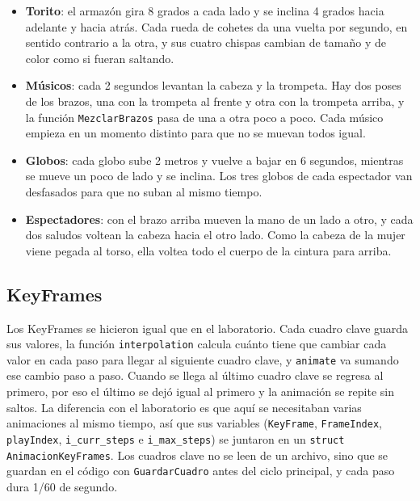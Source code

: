 \documentclass[11pt,a4paper]{article}
\begin{document}
\begin{itemize}
  \item \textbf{Torito}: el armazón gira 8 grados a cada lado y se inclina 4 grados hacia adelante y hacia atrás. Cada rueda de cohetes da una vuelta por segundo, en sentido contrario a la otra, y sus cuatro chispas cambian de tamaño y de color como si fueran saltando.
  \item \textbf{Músicos}: cada 2 segundos levantan la cabeza y la trompeta. Hay dos poses de los brazos, una con la trompeta al frente y otra con la trompeta arriba, y la función \texttt{MezclarBrazos} pasa de una a otra poco a poco. Cada músico empieza en un momento distinto para que no se muevan todos igual.
  \item \textbf{Globos}: cada globo sube 2 metros y vuelve a bajar en 6 segundos, mientras se mueve un poco de lado y se inclina. Los tres globos de cada espectador van desfasados para que no suban al mismo tiempo.
  \item \textbf{Espectadores}: con el brazo arriba mueven la mano de un lado a otro, y cada dos saludos voltean la cabeza hacia el otro lado. Como la cabeza de la mujer viene pegada al torso, ella voltea todo el cuerpo de la cintura para arriba.
\end{itemize}



\subsection{KeyFrames}

Los KeyFrames se hicieron igual que en el laboratorio. Cada cuadro clave guarda sus valores, la función \texttt{interpolation} calcula cuánto tiene que cambiar cada valor en cada paso para llegar al siguiente cuadro clave, y \texttt{animate} va sumando ese cambio paso a paso. Cuando se llega al último cuadro clave se regresa al primero, por eso el último se dejó igual al primero y la animación se repite sin saltos. La diferencia con el laboratorio es que aquí se necesitaban varias animaciones al mismo tiempo, así que sus variables (\texttt{KeyFrame}, \texttt{FrameIndex}, \texttt{playIndex}, \texttt{i\_curr\_steps} e \texttt{i\_max\_steps}) se juntaron en un \texttt{struct AnimacionKeyFrames}. Los cuadros clave no se leen de un archivo, sino que se guardan en el código con \texttt{GuardarCuadro} antes del ciclo principal, y cada paso dura 1/60 de segundo.
\end{document}
